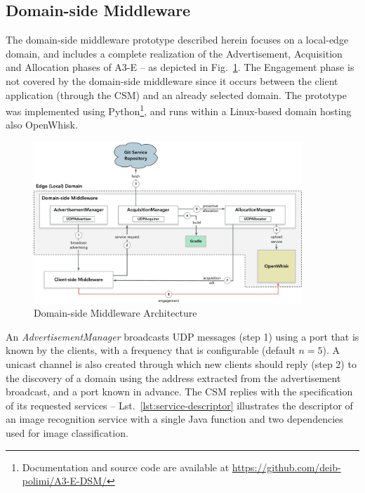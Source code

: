 \subsection{Domain-side Middleware}

The domain-side middleware prototype described herein focuses on a local-edge domain, and includes a complete realization of the Advertisement, Acquisition and Allocation phases of A3-E -- as depicted in Fig.~\ref{fig:domain-prototype}. The Engagement phase is not covered by the domain-side middleware since it occurs between the client application (through the CSM) and an already selected domain. The prototype was implemented using Python\footnote{Documentation and source code are available at \url{https://github.com/deib-polimi/A3-E-DSM/}}, and runs within a Linux-based domain hosting also OpenWhisk. 


\begin{figure}[tbp]
	\includegraphics[width=0.9\textwidth]{figs/a3e-domain-prototype}
	\caption{Domain-side Middleware Architecture}
	\label{fig:domain-prototype}
\end{figure}

An \textit{AdvertisementManager} broadcasts UDP messages (step 1) using a port that is known by the clients, with a frequency that is configurable (default $n=5$). A unicast channel is also created through which new clients should reply (step 2) to the discovery of a domain using the address extracted from the advertisement broadcast, and a port known in advance. The CSM replies with the specification of its requested services -- Lst.~\ref{lst:service-descriptor} illustrates the descriptor of an image recognition service with a single Java function and two dependencies used for image classification.

